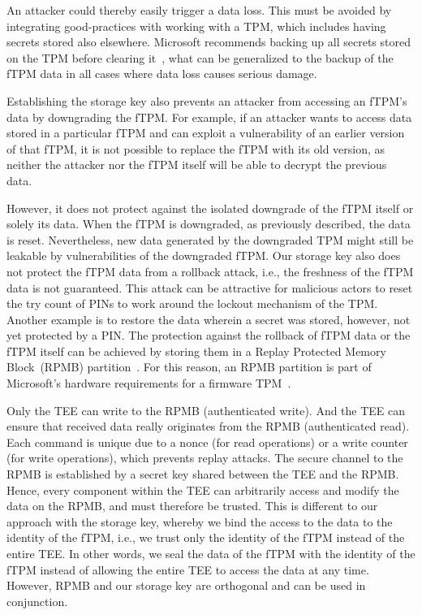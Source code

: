 

An attacker could thereby easily trigger a data loss.
This must be avoided by integrating good-practices with working with a \ac{TPM}, which includes having secrets stored also elsewhere.
Microsoft recommends backing up all secrets stored on the \ac{TPM} before clearing it~\cite{MicrosoftClearRecommendations}, what can be generalized to the backup of the fTPM data in all cases where data loss causes serious damage.


Establishing the storage key also prevents an attacker from accessing an fTPM's data by downgrading the fTPM\@.
For example, if an attacker wants to access data stored in a particular fTPM and can exploit a vulnerability of an earlier version of that fTPM, it is not possible to replace the fTPM with its old version, as neither the attacker nor the fTPM itself will be able to decrypt the previous data.

However, it does not protect against the isolated downgrade of the fTPM itself or solely its data.
When the fTPM is downgraded, as previously described, the data is reset.
Nevertheless, new data generated by the downgraded TPM might still be leakable by vulnerabilities of the downgraded fTPM\@.
Our storage key also does not protect the fTPM data from a rollback attack, i.e., the freshness of the fTPM data is not guaranteed.
This attack can be attractive for malicious actors to reset the try count of PINs to work around the lockout mechanism of the TPM\@.
Another example is to restore the data wherein a secret was stored, however, not yet protected by a PIN\@.
The protection against the rollback of fTPM data or the fTPM itself can be achieved by storing them in a Replay Protected Memory Block~(RPMB) partition~\cite{eMMC, UFS}.
For this reason, an RPMB partition is part of Microsoft's hardware requirements for a firmware TPM~\cite{Raj2015}.

Only the TEE can write to the RPMB (authenticated write).
And the TEE can ensure that received data really originates from the RPMB (authenticated read).
Each command is unique due to a nonce (for read operations) or a write counter (for write operations), which prevents replay attacks.
The secure channel to the RPMB is established by a secret key shared between the TEE and the RPMB\@.
Hence, every component within the TEE can arbitrarily access and modify the data on the RPMB, and must therefore be trusted.
This is different to our approach with the storage key, whereby we bind the access to the data to the identity of the fTPM, i.e., we trust only the identity of the fTPM instead of the entire TEE\@.
In other words, we seal the data of the fTPM with the identity of the fTPM instead of allowing the entire TEE to access the data at any time.
However, RPMB and our storage key are orthogonal and can be used in conjunction.

